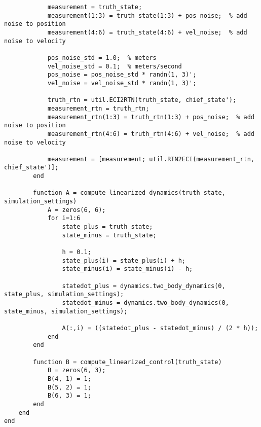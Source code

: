 \begin{lstlisting}
            measurement = truth_state;
            measurement(1:3) = truth_state(1:3) + pos_noise;  % add noise to position
            measurement(4:6) = truth_state(4:6) + vel_noise;  % add noise to velocity

            pos_noise_std = 1.0;  % meters
            vel_noise_std = 0.1;  % meters/second
            pos_noise = pos_noise_std * randn(1, 3)';
            vel_noise = vel_noise_std * randn(1, 3)';
            
            truth_rtn = util.ECI2RTN(truth_state, chief_state');
            measurement_rtn = truth_rtn;
            measurement_rtn(1:3) = truth_rtn(1:3) + pos_noise;  % add noise to position
            measurement_rtn(4:6) = truth_rtn(4:6) + vel_noise;  % add noise to velocity

            measurement = [measurement; util.RTN2ECI(measurement_rtn, chief_state')];
        end

        function A = compute_linearized_dynamics(truth_state, simulation_settings)
            A = zeros(6, 6);
            for i=1:6
                state_plus = truth_state;
                state_minus = truth_state;

                h = 0.1;
                state_plus(i) = state_plus(i) + h;
                state_minus(i) = state_minus(i) - h;

                statedot_plus = dynamics.two_body_dynamics(0, state_plus, simulation_settings);
                statedot_minus = dynamics.two_body_dynamics(0, state_minus, simulation_settings);

                A(:,i) = ((statedot_plus - statedot_minus) / (2 * h));
            end
        end

        function B = compute_linearized_control(truth_state)
            B = zeros(6, 3);
            B(4, 1) = 1;
            B(5, 2) = 1;
            B(6, 3) = 1;
        end
    end
end
\end{lstlisting}
